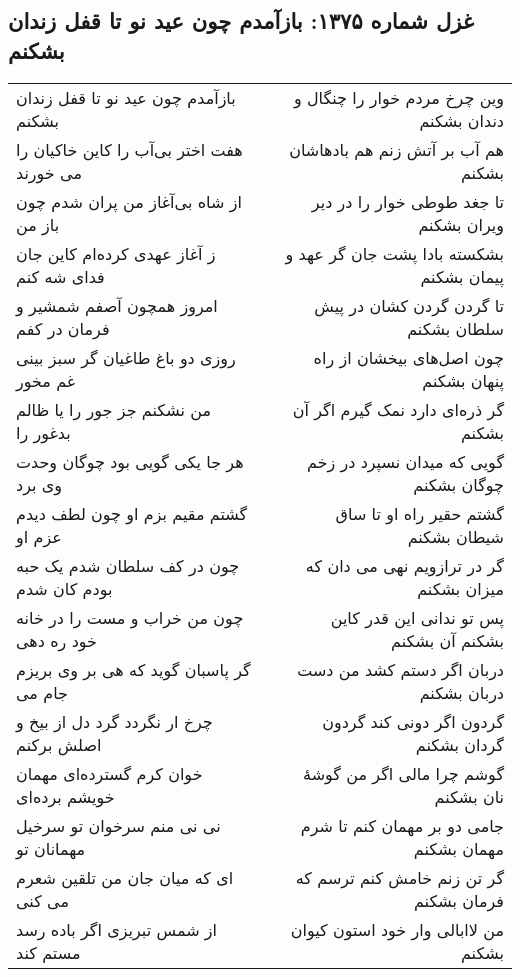 \begin{center}
\section*{غزل شماره ۱۳۷۵: بازآمدم چون عید نو تا قفل زندان بشکنم}
\label{sec:1375}
\begin{longtable}{l p{0.5cm} r}
بازآمدم چون عید نو تا قفل زندان بشکنم
&&
وین چرخ مردم خوار را چنگال و دندان بشکنم
\\
هفت اختر بی‌آب را کاین خاکیان را می خورند
&&
هم آب بر آتش زنم هم بادهاشان بشکنم
\\
از شاه بی‌آغاز من پران شدم چون باز من
&&
تا جغد طوطی خوار را در دیر ویران بشکنم
\\
ز آغاز عهدی کرده‌ام کاین جان فدای شه کنم
&&
بشکسته بادا پشت جان گر عهد و پیمان بشکنم
\\
امروز همچون آصفم شمشیر و فرمان در کفم
&&
تا گردن گردن کشان در پیش سلطان بشکنم
\\
روزی دو باغ طاغیان گر سبز بینی غم مخور
&&
چون اصل‌های بیخشان از راه پنهان بشکنم
\\
من نشکنم جز جور را یا ظالم بدغور را
&&
گر ذره‌ای دارد نمک گیرم اگر آن بشکنم
\\
هر جا یکی گویی بود چوگان وحدت وی برد
&&
گویی که میدان نسپرد در زخم چوگان بشکنم
\\
گشتم مقیم بزم او چون لطف دیدم عزم او
&&
گشتم حقیر راه او تا ساق شیطان بشکنم
\\
چون در کف سلطان شدم یک حبه بودم کان شدم
&&
گر در ترازویم نهی می دان که میزان بشکنم
\\
چون من خراب و مست را در خانه خود ره دهی
&&
پس تو ندانی این قدر کاین بشکنم آن بشکنم
\\
گر پاسبان گوید که هی بر وی بریزم جام می
&&
دربان اگر دستم کشد من دست دربان بشکنم
\\
چرخ ار نگردد گرد دل از بیخ و اصلش برکنم
&&
گردون اگر دونی کند گردون گردان بشکنم
\\
خوان کرم گسترده‌ای مهمان خویشم برده‌ای
&&
گوشم چرا مالی اگر من گوشهٔ نان بشکنم
\\
نی نی منم سرخوان تو سرخیل مهمانان تو
&&
جامی دو بر مهمان کنم تا شرم مهمان بشکنم
\\
ای که میان جان من تلقین شعرم می کنی
&&
گر تن زنم خامش کنم ترسم که فرمان بشکنم
\\
از شمس تبریزی اگر باده رسد مستم کند
&&
من لاابالی وار خود استون کیوان بشکنم
\\
\end{longtable}
\end{center}
